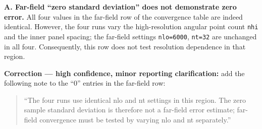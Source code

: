 \documentclass[10pt,a4paper]{article}
\begin{document}
{\par
\vspace{1.5pt}\par\vspace{0.5pt}
\par
\textbf{A. Far-field ``zero standard deviation'' does not demonstrate zero error.} All four values in the far-field row of the convergence table are indeed identical. However, the four runs vary the high-resolution angular point count \texttt{nhi} and the inner panel spacing; the far-field settings \texttt{nlo=6000}, \texttt{nt=32} are unchanged in all four. Consequently, this row does not test resolution dependence in that region.
\par
\textbf{Correction --- high confidence, minor reporting clarification:} add the following note to the ``0'' entries in the far-field row:
\par
\begin{quote}\vspace{-3pt}
``The four runs use identical nlo and nt settings in this region. The zero sample standard deviation is therefore not a far-field error estimate; far-field convergence must be tested by varying nlo and nt separately.''

\end{quote}
\par

}
\end{document}
